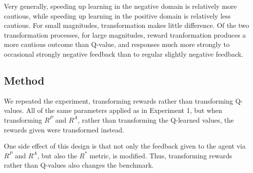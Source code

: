 Very generally, speeding up learning in the negative domain is relatively more cautious, while speeding up learning in the positive domain is relatively less cautious. For small magnitudes, transformation makes little difference. Of the two transformation processes, for large magnitudes, reward tranformation produces a more cautious outcome than Q-value, and responses much more strongly to occasional strongly negative feedback than to regular slightly negative feedback.








\subsection{Method}

We repeated the experiment, transforming rewards rather than transforming Q-values. All of the same parameters applied as in Experiment 1, but when transforming $R^P$ and $R^A$, rather than transforming the Q-learned values, the rewards given were transformed instead.

One side effect of this design is that not only the feedback given to the agent via $R^P$ and $R^A$, but also the $R^*$ metric, is modified. Thus, transforming rewards rather than Q-values also changes the benchmark.